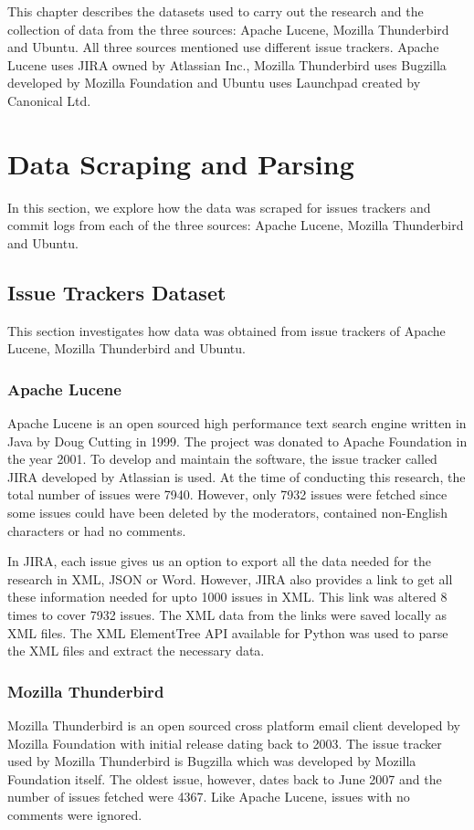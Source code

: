 \documentclass[a4paper,12pt,twoside]{report}
\begin{document}
This chapter describes the datasets used to carry out the research and the collection of data from the three sources: Apache Lucene, Mozilla Thunderbird and Ubuntu. All three sources mentioned use different issue trackers. Apache Lucene uses JIRA owned by Atlassian Inc., Mozilla Thunderbird uses Bugzilla developed by Mozilla Foundation and Ubuntu uses Launchpad created by Canonical Ltd. 

\section{Data Scraping and Parsing}

In this section, we explore how the data was scraped for issues trackers and commit logs from each of the three sources: Apache Lucene, Mozilla Thunderbird and Ubuntu. 

\subsection{Issue Trackers Dataset}
This section investigates how data was obtained from issue trackers of Apache Lucene, Mozilla Thunderbird and Ubuntu. 

\subsubsection{Apache Lucene}
Apache Lucene is an open sourced high performance text search engine written in Java by Doug Cutting in 1999. The project was donated to Apache Foundation in the year 2001. To develop and maintain the software, the issue tracker called JIRA developed by Atlassian is used. At the time of conducting this research, the total number of issues were 7940. However, only 7932 issues were fetched since some issues could have been deleted by the moderators, contained non-English characters or had no comments.

In JIRA, each issue gives us an option to export all the data needed for the research in XML, JSON or Word. However, JIRA also provides a link to get all these information needed for upto 1000 issues in XML. This link was altered 8 times to cover 7932 issues. The XML data from the links were saved locally as XML files. The XML ElementTree API available for Python was used to parse the XML files and extract the necessary data. 

\subsubsection{Mozilla Thunderbird}
Mozilla Thunderbird is an open sourced cross platform email client developed by Mozilla Foundation with initial release dating back to 2003. The issue tracker used by Mozilla Thunderbird is Bugzilla which was developed by Mozilla Foundation itself. The oldest issue, however, dates back to June 2007 and the number of issues fetched were 4367. Like Apache Lucene, issues with no comments were ignored. 
\end{document}
